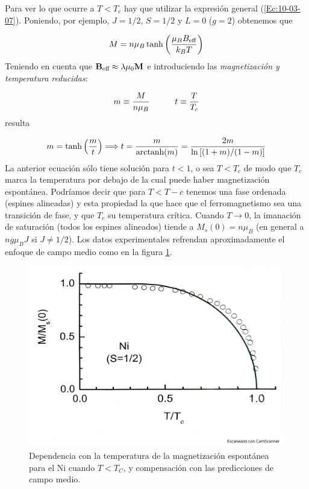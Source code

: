 Para ver lo que ocurre a $T<T_c$ hay que utilizar la expresión general (\ref{Ec:10-03-07}). Poniendo, por ejemplo, $J=1/2$, $S=1/2$ y $L=0$ ($g=2$) obtenemos que

\begin{equation}
	M = n \mu_B \tanh \left( \frac{\mu_B B_{\text{eff}}}{k_B T} \right)
\end{equation}
Teniendo en cuenta que $\mathbf{B}_{\text{eff}} \approx \lambda \mu_0 \mathbf{M}$ e introduciendo las \textit{magnetización y temperatura reducidas}:

\begin{equation}
	m \equiv \frac{M}{n\mu_B} \quad \quad \quad t \equiv \frac{T}{T_c}
\end{equation}
resulta 

\begin{equation}
	m = \tanh \left( \frac{m}{t} \right) \Longrightarrow t = \frac{m}{\text{{arctanh}} (m) } = \frac{2m}{\ln \left[ (1+m)/(1-m) \right]}
\end{equation}
La anterior ecuación sólo tiene solución para $t<1$, o sea $T<T_c$ de modo que $T_c$ marca la temperatura por debajo de la cual puede haber magnetización espontánea. Podríamos decir que para $T<T-c$ tenemos una fase ordenada (espines alineadas) y esta propiedad la que hace que el ferromagnetismo sea una transición de fase, y que $T_c$ su temperatura crítica. Cuando $T\rightarrow 0$, la imanación de saturación (todos los espines alineados) tiende a $M_s(0) = n \mu_B$ (en general a $ng\mu_B J$ si $J\neq 1/2$). Los datos experimentales refrendan aproximadamente el enfoque de campo medio como en la figura \ref{Fig:10-04}.

\begin{figure}[h!] \centering
	\includegraphics[scale=0.35]{Cuerpo/Ch_10/Fotos libro 4.pdf}
	\caption{Dependencia con la temperatura de la magnetización espontánea para el Ni cuando $T<T_C$, y compensación con las predicciones de campo medio.}
	\label{Fig:10-04}
\end{figure}

